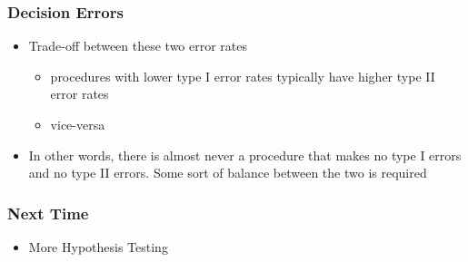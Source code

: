 \documentclass[slides]{beamer}
\begin{document}
\begin{frame}
\frametitle{Decision Errors}
\begin{itemize}
\item Trade-off between these two error rates
\begin{itemize}
\item procedures with lower type I error rates typically have higher type II error rates
\item vice-versa
\end{itemize}
\pause \item In other words, there is almost never a procedure that makes no type I errors and no type II errors.  Some sort of balance between the two is required
\end{itemize}
\end{frame}


\begin{frame}[fragile]
\frametitle{Next Time}

\begin{itemize}
\item More Hypothesis Testing
\end{itemize}

\end{frame}
\end{document}
